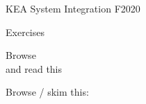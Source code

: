 \documentclass[Screen16to9,17pt]{foils}
\begin{document}
\mytitlepage
{}
{KEA System Integration F2020}



\begin{list2}
\item
\item
\item
\end{list2}

Exercises
\begin{list2}
\item
\item
\end{list2}




\begin{list1}
\item Browse\\

and read this\\

\item Browse / skim this:\\

\end{list1}




\slidenext
\end{document}

